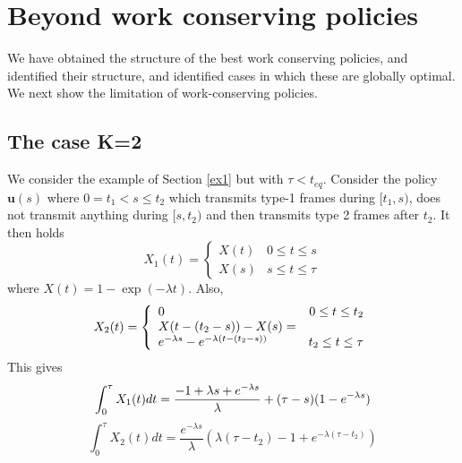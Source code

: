 \documentclass[10pt,twocolumn,conference,final]{IEEEtran}
\newcommand{\ubf}{\mathbf u}
\begin{document}
\section{Beyond work conserving policies}\label{sec:nwc}
We have obtained the structure of the best
work conserving policies, and identified their structure,
and identified cases in which these are globally optimal.
We next show the limitation of work-conserving policies.
\subsection{The case K=2}
\label{ex2}
We consider the example of Section \ref{ex1} but with $\tau < t_{eq}$.
Consider the policy $\ubf(s)$ where $0 = t_1 < s \leq t_2 $
which transmits type-1 frames during $[t_1,s)$, does not
transmit anything during $[s,t_2)$ and then transmits type 2
frames  after $t_2$. It then holds
\[
X_1(t) =
\left\{
\begin{array} {lr}
X(t) & 0 \leq t \leq s \\
X(s) & s \leq t \leq \tau
\end{array}
\right.
\]
where $X(t) = 1 - \exp( - \lambda t ) $. Also,
\[
X_2(t) =
\left\{
\begin{array} {lr}
0  & 0 \leq t \leq t_2 \\
X(t- (t_2 - s)) - X(s) = & \\
e^{-\lambda s} - e^{- \lambda ( t-(t_2-s))}  & t_2 \leq t \leq \tau
\end{array}
\right.\\[-3mm]
\]
This gives\\[-3mm]
\[
\int_0^\tau X_1(t) dt =
\frac{-1+\lambda s  + e^{- \lambda s} } {  \lambda }
+ ( \tau - s )(1 - e^{ - \lambda s })\\[-3mm]
\]
\[
\int_0^\tau X_2(t) dt =
\frac{e^{-\lambda s }}{\lambda}
( \lambda ( \tau - t_2 ) - 1 + e^{ - \lambda ( \tau - t_2 )} )
\]
\end{document}
